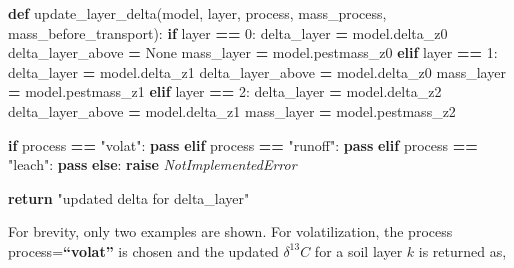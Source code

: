 \documentclass[]{article}
\newenvironment{Shaded}{\begin{snugshade}}{\end{snugshade}}
\newcommand{\KeywordTok}[1]{\textcolor[rgb]{0.13,0.29,0.53}{\textbf{{#1}}}}
\newcommand{\DecValTok}[1]{\textcolor[rgb]{0.00,0.00,0.81}{{#1}}}
\newcommand{\StringTok}[1]{\textcolor[rgb]{0.31,0.60,0.02}{{#1}}}
\newcommand{\VariableTok}[1]{\textcolor[rgb]{0.00,0.00,0.00}{{#1}}}
\newcommand{\ControlFlowTok}[1]{\textcolor[rgb]{0.13,0.29,0.53}{\textbf{{#1}}}}
\newcommand{\OperatorTok}[1]{\textcolor[rgb]{0.81,0.36,0.00}{\textbf{{#1}}}}
\newcommand{\PreprocessorTok}[1]{\textcolor[rgb]{0.56,0.35,0.01}{\textit{{#1}}}}
\newcommand{\NormalTok}[1]{{#1}}
\begin{document}
\begin{Shaded}
\begin{Highlighting}[]

\KeywordTok{def} \NormalTok{update_layer_delta(model, layer, process, mass_process, mass_before_transport):}
    \ControlFlowTok{if} \NormalTok{layer }\OperatorTok{==} \DecValTok{0}\NormalTok{:}
      \NormalTok{delta_layer }\OperatorTok{=} \NormalTok{model.delta_z0}
      \NormalTok{delta_layer_above }\OperatorTok{=} \VariableTok{None}
      \NormalTok{mass_layer }\OperatorTok{=} \NormalTok{model.pestmass_z0}
    \ControlFlowTok{elif} \NormalTok{layer }\OperatorTok{==} \DecValTok{1}\NormalTok{:}
        \NormalTok{delta_layer }\OperatorTok{=} \NormalTok{model.delta_z1}
        \NormalTok{delta_layer_above }\OperatorTok{=} \NormalTok{model.delta_z0}
        \NormalTok{mass_layer }\OperatorTok{=} \NormalTok{model.pestmass_z1}
    \ControlFlowTok{elif} \NormalTok{layer }\OperatorTok{==} \DecValTok{2}\NormalTok{:}
        \NormalTok{delta_layer }\OperatorTok{=} \NormalTok{model.delta_z2}
        \NormalTok{delta_layer_above }\OperatorTok{=} \NormalTok{model.delta_z1}
        \NormalTok{mass_layer }\OperatorTok{=} \NormalTok{model.pestmass_z2}
        
    \ControlFlowTok{if} \NormalTok{process }\OperatorTok{==} \StringTok{"volat"}\NormalTok{:}
        \ControlFlowTok{pass}
    \ControlFlowTok{elif} \NormalTok{process }\OperatorTok{==} \StringTok{"runoff"}\NormalTok{:}
        \ControlFlowTok{pass}
    \ControlFlowTok{elif} \NormalTok{process }\OperatorTok{==} \StringTok{"leach"}\NormalTok{:}
        \ControlFlowTok{pass}
    \ControlFlowTok{else}\NormalTok{:}
        \ControlFlowTok{raise} \PreprocessorTok{NotImplementedError}
    
    \ControlFlowTok{return} \StringTok{"updated delta for delta_layer"}
                       
\end{Highlighting}
\end{Shaded}

For brevity, only two examples are shown. For volatilization, the
process process=\textbf{``volat''} is chosen and the updated
\(\delta ^{13}C\) for a soil layer \(k\) is returned as,
\end{document}
